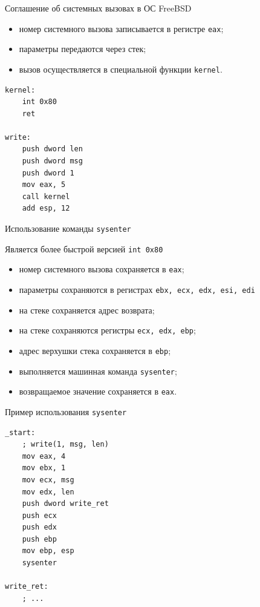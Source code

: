 \documentclass[utf8, russian, aspectratio=1610]{beamer}
\begin{document}
\begin{frame}[fragile]{Соглашение об системных вызовах в ОС FreeBSD}
    \begin{itemize}
        \item номер системного вызова записывается в регистре {\tt eax};
        \item параметры передаются через стек;
        \item вызов осуществляется в специальной функции {\tt kernel}.
    \end{itemize}
\begin{verbatim}
kernel:
    int 0x80
    ret

write:
    push dword len
    push dword msg
    push dword 1
    mov eax, 5
    call kernel
    add esp, 12
\end{verbatim}
\end{frame}

\begin{frame}[fragile]{Использование команды {\tt sysenter}}

    Является более быстрой версией {\tt int 0x80}
    \begin{itemize}
         \item номер системного вызова сохраняется в {\tt eax};
         \item параметры сохраняются в регистрах {\tt ebx, ecx, edx, esi, edi}
         \item на стеке сохраняется адрес возврата;
         \item на стеке сохраняются регистры {\tt ecx, edx, ebp};
         \item адрес верхушки стека сохраняется в {\tt ebp};
         \item выполняется машинная команда {\tt sysenter};
         \item возвращаемое значение сохраняется в {\tt eax}.
    \end{itemize}
\end{frame}

\begin{frame}[fragile]{Пример использования {\tt sysenter}}
\begin{verbatim}
_start:
    ; write(1, msg, len)
    mov eax, 4
    mov ebx, 1
    mov ecx, msg
    mov edx, len
    push dword write_ret
    push ecx
    push edx
    push ebp
    mov ebp, esp
    sysenter

write_ret:
    ; ...
\end{verbatim}
\end{frame}
\end{document}
